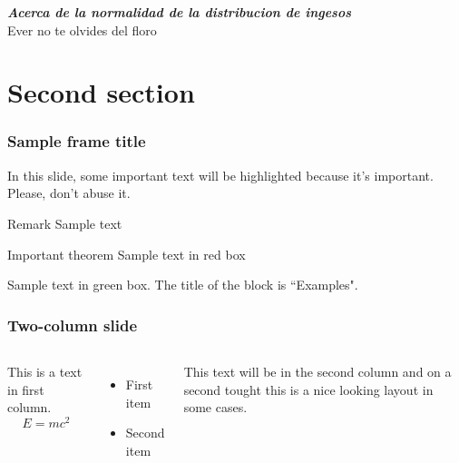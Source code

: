 \documentclass{beamer}
\begin{document}


\begin{frame}
  \textbf{\textit{
    Acerca de la normalidad de la distribucion de ingesos
  }} \\
  \alert{Ever no te olvides del floro}
\end{frame}

\section{Second section}

\begin{frame}
\frametitle{Sample frame title}

In this slide, some important text will be
\alert{highlighted} because it's important.
Please, don't abuse it.

\begin{block}{Remark}
Sample text
\end{block}

\begin{alertblock}{Important theorem}
Sample text in red box
\end{alertblock}

\begin{examples}
Sample text in green box. The title of the block is ``Examples".
\end{examples}
\end{frame}


\begin{frame}
\frametitle{Two-column slide}

\begin{columns}

This is a text in first column.
$$E=mc^2$$
\begin{itemize}
\item First item
\item Second item
\end{itemize}

This text will be in the second column
and on a second tought this is a nice looking
layout in some cases.
\end{columns}
\end{frame}
\end{document}
